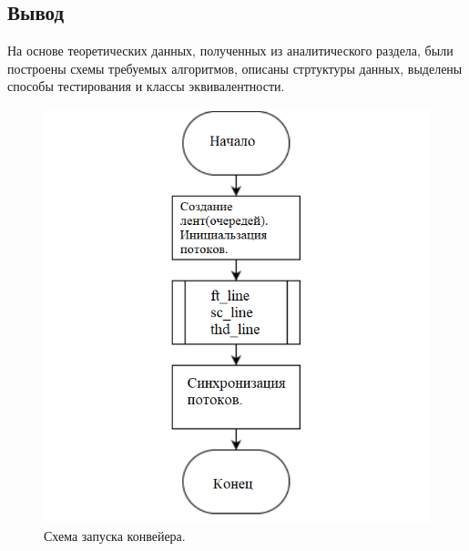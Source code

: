 \subsection{Вывод}

На основе теоретических данных, полученных из аналитического раздела, были построены схемы требуемых алгоритмов, описаны стртуктуры данных, выделены способы тестирования и классы эквивалентности.

\begin{figure}
    \centering
    \includegraphics[scale=0.75]{shema_1.png}
    \caption{Схема запуска конвейера.}
    \label{img:classic}
\end{figure}


